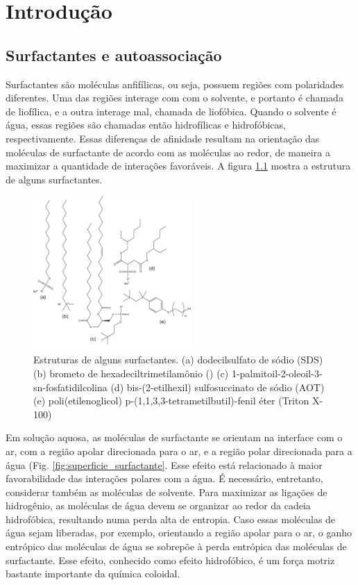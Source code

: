 \part{Introdução}
	\chapter{Surfactantes e autoassociação}
	
	Surfactantes são moléculas anfifílicas, ou seja, possuem regiões com polaridades diferentes. Uma das regiões interage com com o solvente, e portanto é chamada de liofílica, e a outra interage mal, chamada de liofóbica. Quando o solvente é água, essas regiões são chamadas então hidrofílicas e hidrofóbicas, respectivamente. Essas diferenças de afinidade resultam na orientação das moléculas de surfactante de acordo com as moléculas ao redor, de maneira a maximizar a quantidade de interações favoráveis. A figura \ref{fig:estrutura_surfactantes} mostra a estrutura de alguns surfactantes.
	
	\begin{figure}[H]  %
		\centering
		\includegraphics[width=6cm]{./imagens/introducao/estrutura_surfactantes}
		\caption{Estruturas de alguns surfactantes. (a) dodecilsulfato de sódio (SDS) (b) brometo de hexadeciltrimetilamônio (\CTAB) (c) 1-palmitoil-2-oleoil-3-sn-fosfatidilcolina (d) bis-(2-etilhexil) sulfosuccinato de sódio (AOT) (e) poli(etilenoglicol) p-(1,1,3,3-tetrametilbutil)-fenil éter (Triton X-100)}
		\label{fig:estrutura_surfactantes}
	\end{figure}
	
	Em solução aquosa, as moléculas de surfactante se orientam na interface com o ar, com a região apolar direcionada para o ar, e a região polar direcionada para a água (Fig. \ref{fig:superficie_surfactante}. Esse efeito está relacionado à maior favorabilidade das interações polares com a água. É necessário, entretanto, considerar também as moléculas de solvente. Para maximizar as ligações de hidrogênio, as moléculas de água devem se organizar ao redor da cadeia hidrofóbica, resultando numa perda alta de entropia. Caso essas moléculas de água sejam liberadas, por exemplo, orientando a região apolar para o ar, o ganho entrópico das moléculas de água se sobrepõe à perda entrópica das moléculas de surfactante. Esse efeito, conhecido como efeito hidrofóbico, é um força motriz bastante importante da química coloidal.
	
